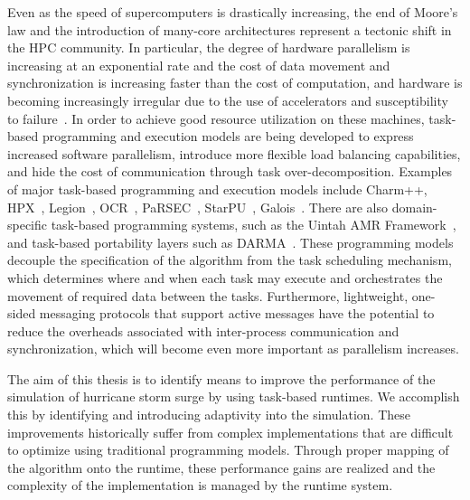 Even as the speed of supercomputers is drastically increasing, the end of Moore's law and the introduction of many-core architectures represent a tectonic shift in the HPC community.
In particular, the degree of hardware parallelism is increasing at an exponential rate and the cost of data movement and synchronization is increasing faster than the cost of computation, and hardware is becoming increasingly irregular due to the use of accelerators and susceptibility to failure~\cite{Kogge2013}.
In order to achieve good resource utilization on these machines, task-based programming and execution models are being developed to express increased software parallelism, introduce more flexible load balancing capabilities, and hide the cost of communication through task over-decomposition. 
Examples of major task-based programming and execution models include Charm++, HPX~\cite{hpx2}, Legion~\cite{legion}, OCR~\cite{ocr}, PaRSEC~\cite{parsec}, StarPU~\cite{starpu}, Galois~\cite{Kulkarni2007, Pingali2011}.
There are also domain-specific task-based programming systems, such as the Uintah AMR Framework~\cite{uintah}, and task-based portability layers such as DARMA~\cite{darma}.
These programming models decouple the specification of the algorithm from the task scheduling mechanism, which determines where and when each task may execute and orchestrates the movement of required data between the tasks.
Furthermore, lightweight, one-sided messaging protocols that support active messages have the potential to reduce the overheads associated with inter-process communication and synchronization, which will become even more important as parallelism increases.

The aim of this thesis is to identify means to improve the performance of the simulation of hurricane storm surge by using task-based runtimes. We accomplish this by identifying and introducing adaptivity into the simulation. These improvements historically suffer from complex implementations that are difficult to optimize using traditional programming models. Through proper mapping of the algorithm onto the runtime, these performance gains are realized and the complexity of the implementation is managed by the runtime system.





%